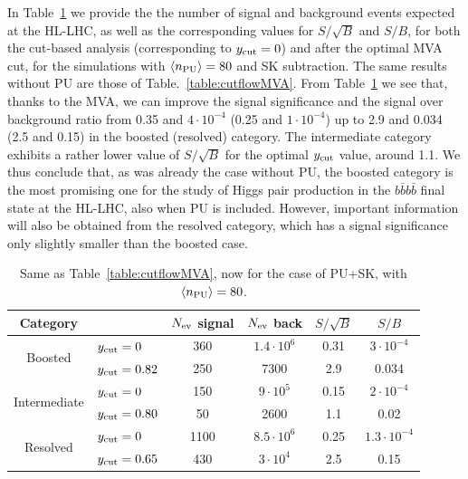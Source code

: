 In Table~\ref{table:cutflowMVA_PU}
we provide the  the number of signal and
    background events expected
    at the HL-LHC, as well as the
    corresponding values for $S/\sqrt{B}$ and $S/B$,
    for both the cut-based analysis (corresponding
    to $y_{\rm cut}=0$) and after the
    optimal MVA cut, for the simulations
    with $\left\langle n_{\rm PU}\right\rangle=80$
    and SK subtraction.
    The same results without PU are those of
    Table.~\ref{table:cutflowMVA}.
    From Table~\ref{table:cutflowMVA_PU} we see that, thanks
to the MVA, we can improve the signal significance and the
signal over background ratio from 0.35 and $4\cdot 10^{-4}$
(0.25 and $1\cdot 10^{-4}$) up to 2.9 and 0.034 (2.5 and 0.15)
in the boosted (resolved) category.
%
The intermediate category exhibits a rather lower value of $S/\sqrt{B}$
for the optimal $y_{\rm cut}$ value, around 1.1.
%
We thus conclude that, as was already the case
without PU,
the boosted category is the most promising
one for the study of Higgs pair production in the $b\bar{b}b\bar{b}$
final state
at the HL-LHC, also when PU is included.
%
However, important information will also be obtained from
the resolved category, which has a signal significance
only slightly smaller than the boosted case.



\begin{table}[t]
  \centering
  \begin{tabular}{|c|l|c|c|c|c|}
    \hline
    Category  &   &  $N_{\rm ev}$ signal &  $N_{\rm ev}$ back  &  $S/\sqrt{B}$ & $S/B$ \\ 
    \hline
    \hline
    \multirow{2}{*}{Boosted} &  $y_{\rm cut}=0$  & 360   &  $1.4\cdot 10^6$ & 0.31   &
     $3\cdot 10^{-4}$  \\
    &  $y_{\rm cut}=0.82$ &  250 & 7300  & 2.9    & 0.034  \\
    \hline
    \hline
    \multirow{2}{*}{Intermediate} &  $y_{\rm cut}=0$  &  150  & $9\cdot 10^5$    & 0.15    &
     $2\cdot 10^{-4}$ \\
    &  $y_{\rm cut}=0.80$ & 50 & 2600  &  1.1   & 0.02 \\
    \hline
    \hline
    \multirow{2}{*}{Resolved} &  $y_{\rm cut}=0$  &  1100  & $8.5\cdot 10^6$
    & 0.25    &  $1.3\cdot 10^{-4}$  \\
    &  $y_{\rm cut}=0.65$ & 430  & $3\cdot 10^4$  &  2.5   & 0.15  \\
    \hline
      \end{tabular}
  \caption{\small Same as Table~\ref{table:cutflowMVA}, now for the case
    of PU+SK, with $\left\langle n_{\rm PU}\right\rangle=80$.
        \label{table:cutflowMVA_PU}
  }
\end{table}

